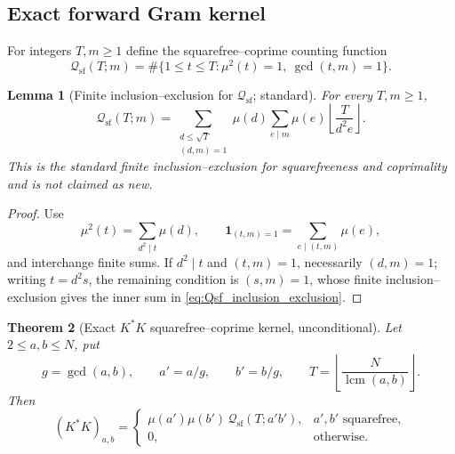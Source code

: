 \documentclass[11pt]{amsart}
\numberwithin{equation}{section}
\theoremstyle{plain}
\newtheorem{theorem}{Theorem}[section]
\newtheorem{lemma}[theorem]{Lemma}
\theoremstyle{definition}
\theoremstyle{remark}
\newcommand{\one}{\mathbf 1}
\newcommand{\mob}{\mu}
\DeclareMathOperator{\lcm}{lcm}
\begin{document}
\subsection{Exact forward Gram kernel}
\label{subsec:forward_gram_kernel}

For integers $T,m\ge1$ define the squarefree--coprime counting function
\begin{equation}
\mathcal Q_{\mathrm{sf}}(T;m)
=\#\{1\le t\le T:\mob^2(t)=1,\ \gcd(t,m)=1\}.
\label{eq:Qsf_definition}
\end{equation}

\begin{lemma}[Finite inclusion--exclusion for $\mathcal Q_{\mathrm{sf}}$; standard]
\label{lem:Qsf_inclusion_exclusion}
For every $T,m\ge1$,
\begin{equation}
\mathcal Q_{\mathrm{sf}}(T;m)
=\sum_{\substack{d\le\sqrt T\\(d,m)=1}}\mob(d)
\sum_{e\mid m}\mob(e)
\left\lfloor\frac{T}{d^2e}\right\rfloor.
\label{eq:Qsf_inclusion_exclusion}
\end{equation}
This is the standard finite inclusion--exclusion for squarefreeness and coprimality and is not claimed as new.
\end{lemma}

\begin{proof}
Use
\begin{equation}
\mob^2(t)=\sum_{d^2\mid t}\mob(d),
\qquad
\one_{(t,m)=1}=\sum_{e\mid(t,m)}\mob(e),
\label{eq:Qsf_indicators}
\end{equation}
and interchange finite sums.  If $d^2\mid t$ and $(t,m)=1$, necessarily $(d,m)=1$; writing $t=d^2s$, the remaining condition is $(s,m)=1$, whose finite inclusion--exclusion gives the inner sum in \eqref{eq:Qsf_inclusion_exclusion}.
\end{proof}

\begin{theorem}[Exact $K^*K$ squarefree--coprime kernel, unconditional]
\label{thm:KstarK_kernel}
Let $2\le a,b\le N$, put
\begin{equation}
g=\gcd(a,b),
\qquad a'=a/g,
\qquad b'=b/g,
\qquad T=\left\lfloor\frac{N}{\lcm(a,b)}\right\rfloor.
\label{eq:KstarK_reduced_parameters}
\end{equation}
Then
\begin{equation}
(K^*K)_{a,b}=
\begin{cases}
\mob(a')\mob(b')\,\mathcal Q_{\mathrm{sf}}(T;a'b'),
& a',b'\text{ squarefree},\\[4pt]
0,&\text{otherwise}.
\end{cases}
\label{eq:KstarK_exact}
\end{equation}
\end{theorem}
\end{document}
